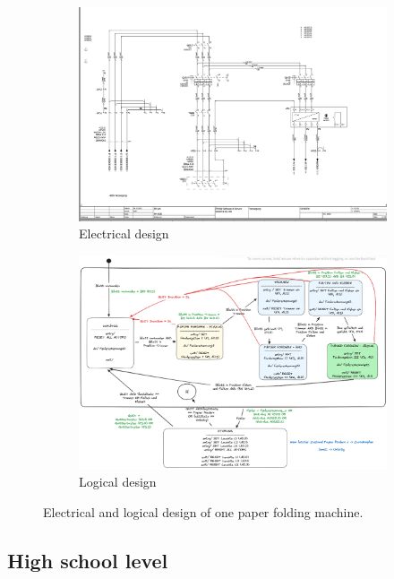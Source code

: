 \documentclass{PDS}
\begin{document}
\begin{figure}[htbp]
    \centering
    \begin{subfigure}[b]{0.45\textwidth}
        \includegraphics[width=\textwidth]{./figures/paper_electric.png}
        \caption{Electrical design}
        \label{fig:paper-sub-1}
    \end{subfigure}
    \hfill
    \begin{subfigure}[b]{0.5\textwidth}
        \includegraphics[width=\textwidth]{./figures/paper_control.png}
        \caption{Logical design}
        \label{fig:paper-sub-2}
    \end{subfigure}
    \caption{Electrical and logical design of one paper folding machine.}
    \label{fig:paper-sub}
\end{figure}

\subsection{High school level}
\label{sec:school}
\end{document}
